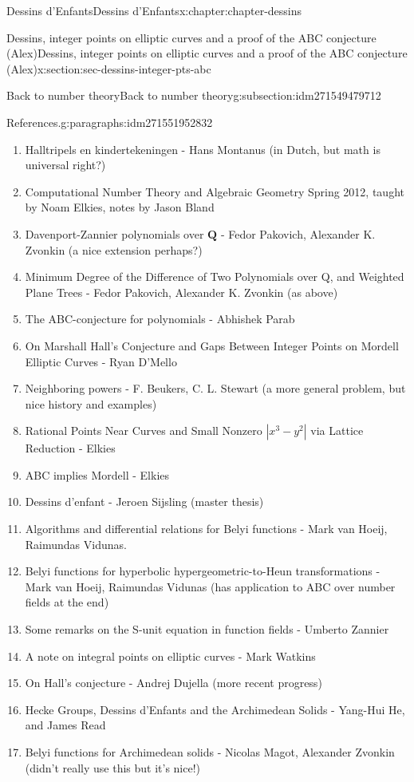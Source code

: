 \documentclass[oneside,10pt,]{book}
\numberwithin{equation}{section}
\newcommand{\QQ}{\mathbf{Q}}
\begin{document}
\begin{chapterptx}{Dessins d'Enfants}{}{Dessins d'Enfants}{}{}{x:chapter:chapter-dessins}
\begin{sectionptx}{Dessins, integer points on elliptic curves and a proof of the ABC conjecture (Alex)}{}{Dessins, integer points on elliptic curves and a proof of the ABC conjecture (Alex)}{}{}{x:section:sec-dessins-integer-pts-abc}
\begin{subsectionptx}{Back to number theory}{}{Back to number theory}{}{}{g:subsection:idm271549479712}
\begin{paragraphs}{References.}{g:paragraphs:idm271551952832}
\begin{enumerate}
\item{}Halltripels en kindertekeningen - Hans Montanus (in Dutch, but math is universal right?)%
\item{}Computational Number Theory and Algebraic Geometry Spring 2012, taught by Noam Elkies, notes by Jason Bland%
\item{}Davenport-Zannier polynomials over \(\QQ\) - Fedor Pakovich, Alexander K. Zvonkin (a nice extension perhaps?)%
\item{}Minimum Degree of the Difference of Two Polynomials over Q, and Weighted Plane Trees -  Fedor Pakovich,  Alexander K. Zvonkin (as above)%
\item{}The ABC-conjecture for polynomials - Abhishek Parab%
\item{}On Marshall Hall's Conjecture and Gaps Between Integer Points on Mordell Elliptic Curves - Ryan D'Mello%
\item{}Neighboring powers - F. Beukers, C. L. Stewart (a more general problem, but nice history and examples)%
\item{}Rational Points Near Curves and Small Nonzero \(| x^3 - y^2|\) via Lattice Reduction - Elkies%
\item{}ABC implies Mordell - Elkies%
\item{}Dessins d'enfant -  Jeroen Sijsling (master thesis)%
\item{}Algorithms and differential relations for Belyi functions - Mark van Hoeij, Raimundas Vidunas.%
\item{}Belyi functions for hyperbolic hypergeometric-to-Heun transformations -  Mark van Hoeij, Raimundas Vidunas (has application to ABC over number fields at the end)%
\item{}Some remarks on the S-unit equation in function fields  - Umberto Zannier%
\item{}A note on integral points on elliptic curves - Mark Watkins%
\item{}On Hall’s conjecture - Andrej Dujella (more recent progress)%
\item{}Hecke Groups, Dessins d'Enfants and the Archimedean Solids -  Yang-Hui He, and James Read%
\item{}Belyi functions for Archimedean solids - Nicolas Magot, Alexander Zvonkin (didn't really use this but it's nice!)%
\end{enumerate}
%
\end{paragraphs}%
\end{subsectionptx}
\end{sectionptx}
%
%
\typeout{************************************************}

\end{chapterptx}
\end{document}
